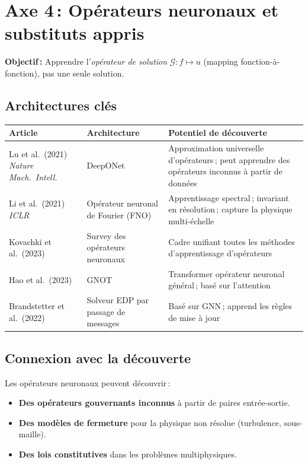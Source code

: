 \documentclass[11pt,a4paper]{article}
\begin{document}
\section{Axe 4\,: Opérateurs neuronaux et substituts appris}

\textbf{Objectif\,:} Apprendre l'\emph{opérateur de solution} $\mathcal{G}: f \mapsto u$ (mapping fonction-à-fonction), pas une seule solution.

\subsection{Architectures clés}

\begin{center}
\renewcommand{\arraystretch}{1.3}
\begin{tabular}{@{}p{3.5cm} p{3.5cm} p{5.5cm}@{}}
\toprule
\textbf{Article} & \textbf{Architecture} & \textbf{Potentiel de découverte} \\
\midrule
Lu et al.\ (2021) \textit{Nature Mach.\ Intell.} & DeepONet & Approximation universelle d'opérateurs\,; peut apprendre des opérateurs inconnus à partir de données \\
\addlinespace
Li et al.\ (2021) \textit{ICLR} & Opérateur neuronal de Fourier (FNO) & Apprentissage spectral\,; invariant en résolution\,; capture la physique multi-échelle \\
\addlinespace
Kovachki et al.\ (2023) & Survey des opérateurs neuronaux & Cadre unifiant toutes les méthodes d'apprentissage d'opérateurs \\
\addlinespace
Hao et al.\ (2023) & GNOT & Transformer opérateur neuronal général\,; basé sur l'attention \\
\addlinespace
Brandstetter et al.\ (2022) & Solveur EDP par passage de messages & Basé sur GNN\,; apprend les règles de mise à jour \\
\bottomrule
\end{tabular}
\end{center}

\subsection{Connexion avec la découverte}

Les opérateurs neuronaux peuvent découvrir\,:
\begin{itemize}[leftmargin=1.8em,itemsep=2pt]
\item \textbf{Des opérateurs gouvernants inconnus} à partir de paires entrée-sortie.
\item \textbf{Des modèles de fermeture} pour la physique non résolue (turbulence, sous-maille).
\item \textbf{Des lois constitutives} dans les problèmes multiphysiques.
\end{itemize}
\end{document}
